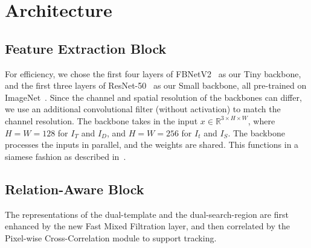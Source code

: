 \section{Architecture }\label{sec:architecture}

\subsection{Feature Extraction Block}
For efficiency, we chose the first four layers of FBNetV2~\cite{wu2019fbnet} as our Tiny backbone, and the first three layers of ResNet-50~\cite{he2016deep} as our Small backbone, all pre-trained on ImageNet~\cite{deng2009imagenet}. Since the channel and spatial resolution of the backbones can differ, we use an additional convolutional filter (without activation) to match the channel resolution. The backbone takes in the input $x \in \mathbb{R}^{3 \times H \times W}$, where $H=W=128$ for $I_T$ and $I_D$, and $H=W=256$ for $I_t$ and $I_S$. The backbone processes the inputs in parallel, and the weights are shared. This functions in a siamese fashion as described in~\cite{bertinetto2016fully}.

\subsection{Relation-Aware Block} 
The representations of the dual-template and the dual-search-region are first enhanced by the new Fast Mixed Filtration layer, and then correlated by the Pixel-wise Cross-Correlation module to support tracking.



